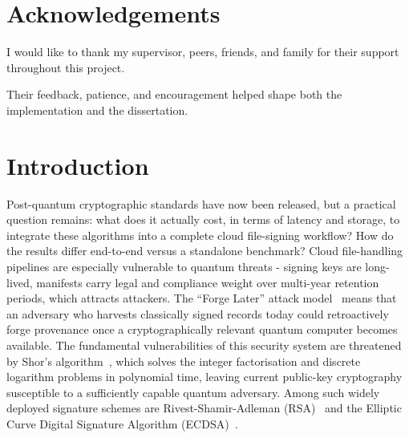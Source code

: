 \documentclass[12pt,a4paper]{article}
\begin{document}
\section*{Acknowledgements}
I would like to thank my supervisor, peers, friends, and family for their support throughout this project.

Their feedback, patience, and encouragement helped shape both the implementation and the dissertation.
\clearpage

\tableofcontents
\clearpage

\listoftables
\clearpage

\listoffigures
\clearpage
{}


\section{Introduction}
\label{sec:intro}

Post-quantum cryptographic standards have now been released, but a practical question remains: what does it actually cost, in terms of latency and storage, to integrate these algorithms into a complete cloud file-signing workflow? How do the results differ end-to-end versus a standalone benchmark? Cloud file-handling pipelines are especially vulnerable to quantum threats - signing keys are long-lived, manifests carry legal and compliance weight over multi-year retention periods, which attracts attackers. The ``Forge Later'' attack model~\cite{sectigo-hndl-2025,hashicorp-hndl-2025} means that an adversary who harvests classically signed records today could retroactively forge provenance once a cryptographically relevant quantum computer becomes available. The fundamental vulnerabilities of this security system are threatened by Shor's algorithm~\cite{shor1997}, which solves the integer factorisation and discrete logarithm problems in polynomial time, leaving current public-key cryptography susceptible to a sufficiently capable quantum adversary. Among such widely deployed signature schemes are Rivest-Shamir-Adleman (RSA)~\cite{rivest1978rsa} and the Elliptic Curve Digital Signature Algorithm (ECDSA)~\cite{johnson2001ecdsa}.
\end{document}
